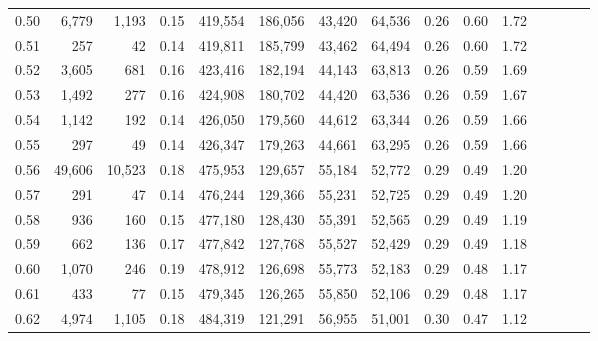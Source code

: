 \begin{tabular}{rrrcrrrrrrrrrrr}
0.50 &   6,779 &   1,193 &                                       0.15 &  419,554 &  186,056 &   43,420 &   64,536 &  0.26 &  0.60 &                         1.72 \\
0.51 &     257 &      42 &                                       0.14 &  419,811 &  185,799 &   43,462 &   64,494 &  0.26 &  0.60 &                         1.72 \\
0.52 &   3,605 &     681 &                                       0.16 &  423,416 &  182,194 &   44,143 &   63,813 &  0.26 &  0.59 &                         1.69 \\
0.53 &   1,492 &     277 &                                       0.16 &  424,908 &  180,702 &   44,420 &   63,536 &  0.26 &  0.59 &                         1.67 \\
0.54 &   1,142 &     192 &                                       0.14 &  426,050 &  179,560 &   44,612 &   63,344 &  0.26 &  0.59 &                         1.66 \\
0.55 &     297 &      49 &                                       0.14 &  426,347 &  179,263 &   44,661 &   63,295 &  0.26 &  0.59 &                         1.66 \\
0.56 &  49,606 &  10,523 &                                       0.18 &  475,953 &  129,657 &   55,184 &   52,772 &  0.29 &  0.49 &                         1.20 \\
0.57 &     291 &      47 &                                       0.14 &  476,244 &  129,366 &   55,231 &   52,725 &  0.29 &  0.49 &                         1.20 \\
0.58 &     936 &     160 &                                       0.15 &  477,180 &  128,430 &   55,391 &   52,565 &  0.29 &  0.49 &                         1.19 \\
0.59 &     662 &     136 &                                       0.17 &  477,842 &  127,768 &   55,527 &   52,429 &  0.29 &  0.49 &                         1.18 \\
0.60 &   1,070 &     246 &                                       0.19 &  478,912 &  126,698 &   55,773 &   52,183 &  0.29 &  0.48 &                         1.17 \\
0.61 &     433 &      77 &                                       0.15 &  479,345 &  126,265 &   55,850 &   52,106 &  0.29 &  0.48 &                         1.17 \\
0.62 &   4,974 &   1,105 &                                       0.18 &  484,319 &  121,291 &   56,955 &   51,001 &  0.30 &  0.47 &                         1.12 \\

\end{tabular}
